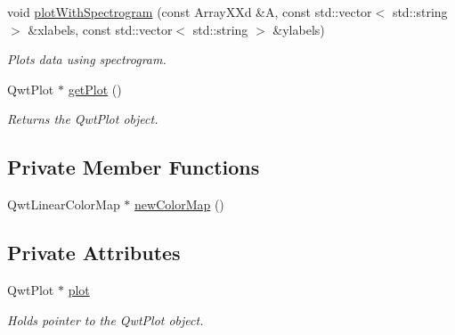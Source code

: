 \begin{DoxyCompactItemize}
void \hyperlink{class_c_plot2_d_a1fbafb6098887872e62cbec35ad08d0f}{plot\-With\-Spectrogram} (const Array\-X\-Xd \&A, const std\-::vector$<$ std\-::string $>$ \&xlabels, const std\-::vector$<$ std\-::string $>$ \&ylabels)
\begin{DoxyCompactList}\small\item\em Plots data using spectrogram. \end{DoxyCompactList}\item 
Qwt\-Plot $\ast$ \hyperlink{class_c_plot2_d_a638d86e37cd2c349f73fd44e33b30ee6}{get\-Plot} ()
\begin{DoxyCompactList}\small\item\em Returns the Qwt\-Plot object. \end{DoxyCompactList}\end{DoxyCompactItemize}
\subsection*{Private Member Functions}
\begin{DoxyCompactItemize}
\item 
Qwt\-Linear\-Color\-Map $\ast$ \hyperlink{class_c_plot2_d_a8daa9859c3f21a1bb234ab9291bb2edc}{new\-Color\-Map} ()
\end{DoxyCompactItemize}
\subsection*{Private Attributes}
\begin{DoxyCompactItemize}
\item 
Qwt\-Plot $\ast$ \hyperlink{class_c_plot2_d_a2aa95de8ef10820fecda3c1ba2ad0605}{plot}
\begin{DoxyCompactList}\small\item\em Holds pointer to the Qwt\-Plot object. \end{DoxyCompactList}\end{DoxyCompactItemize}


